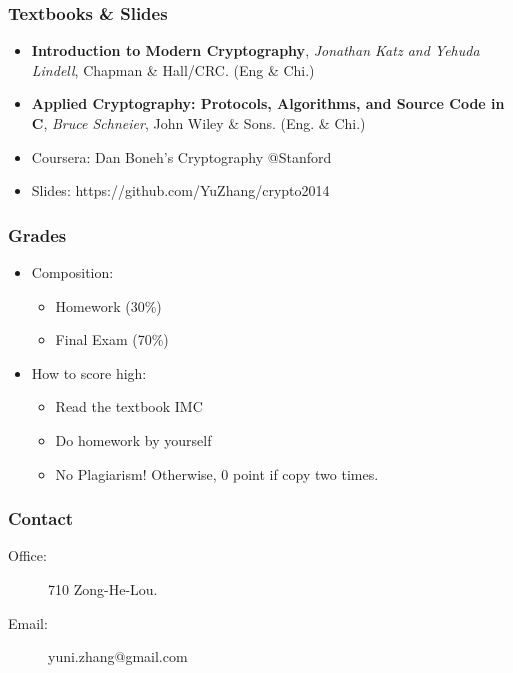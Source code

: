 \begin{frame}\frametitle{Textbooks \& Slides}
\begin{itemize}
\item \textbf{Introduction to Modern Cryptography}, \emph{Jonathan Katz and Yehuda Lindell}, Chapman \& Hall/CRC. (Eng \& Chi.)
\item \textbf{Applied Cryptography: Protocols, Algorithms, and Source Code in C}, \emph{Bruce Schneier}, John Wiley \& Sons. (Eng. \& Chi.)
\item Coursera: Dan Boneh's Cryptography @Stanford
\item Slides: https://github.com/YuZhang/crypto2014
\end{itemize}
\end{frame}
\begin{frame}\frametitle{Grades}
\begin{itemize}
\item Composition:
\begin{itemize}
\item Homework (30\%)
\item Final Exam (70\%)
\end{itemize}
\item How to score high:
\begin{itemize}
\item Read the textbook IMC
\item Do homework by yourself
\item \alert{No Plagiarism!} Otherwise, 0 point if copy two times. 
\end{itemize}
\end{itemize}
\end{frame}
\begin{frame}\frametitle{Contact}
\begin{description} 
\item[Office:] 710 Zong-He-Lou.
\item[Email:] yuni.zhang@gmail.com 
\end{description}
\end{frame}

